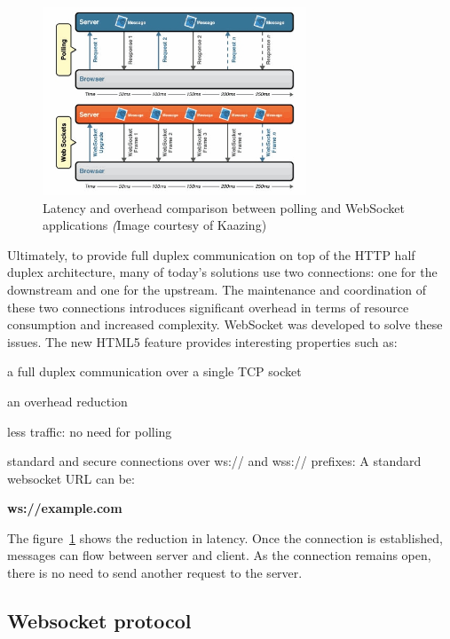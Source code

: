 \documentclass[pdftex,10pt,a4paper]{report}
\newenvironment{packed_item}{
\begin{itemize}
  \setlength{\itemsep}{1pt}
  \setlength{\parskip}{0pt}
  \setlength{\parsep}{0pt}
}{\end{itemize}}
\begin{document}
\begin{figure}[h!]
		\centering
		\includegraphics[width=0.7\textwidth]{./ws_poll.jpg}
		\caption{Latency and overhead comparison between polling and WebSocket applications \textit(Image courtesy of Kaazing)}
		\label{Latency and overhead comparison between polling and WebSocket applications}
\end{figure}

Ultimately, to provide full duplex communication on top of the HTTP half duplex architecture, many of today's solutions use two connections: one for the downstream and one for the upstream. The maintenance and coordination of these two connections introduces significant overhead in terms of resource consumption and increased complexity. WebSocket was developed to solve these issues. The new HTML5 feature provides interesting properties such as:
\begin{packed_item}
	\item a full duplex communication over a single TCP socket
	\item an overhead reduction
	\item less traffic: no need for polling
	\item standard and secure connections over ws:// and wss:// prefixes: A standard websocket URL can be:
	\begin{center}
		\textbf{ws://example.com}
	\end{center}
\end{packed_item}

The figure~\ref{Latency and overhead comparison between polling and WebSocket applications} shows the reduction in latency. Once the connection is established, messages can flow between server and client. As the connection remains open, there is no need to send another request to the server.

\subsection{Websocket protocol}
\end{document}

